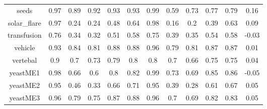 \documentclass{article}%
\begin{document}
\begin{tabular}{|c|c|c|c|c|c|c|c|c|c|c|c|}
seeds&0.97&0.89&0.92&0.93&0.93&0.99&0.59&0.73&0.77&0.79&0.16\\%
solar\_flare&0.97&0.24&0.24&0.48&0.64&0.98&0.16&0.2&0.39&0.63&0.09\\%
transfusion&0.76&0.34&0.32&0.51&0.58&0.75&0.39&0.35&0.54&0.58&{-}0.03\\%
vehicle&0.93&0.84&0.81&0.88&0.88&0.96&0.79&0.81&0.87&0.87&0.01\\%
vertebal&0.9&0.7&0.73&0.79&0.8&0.8&0.7&0.66&0.75&0.75&0.04\\%
yeastME1&0.98&0.66&0.6&0.8&0.82&0.99&0.73&0.69&0.85&0.86&{-}0.05\\%
yeastME2&0.95&0.46&0.33&0.66&0.71&0.95&0.39&0.28&0.61&0.67&0.05\\%
yeastME3&0.96&0.79&0.75&0.87&0.88&0.96&0.7&0.69&0.82&0.83&0.05\\%
\hline%
\end{tabular}

%
\end{document}
